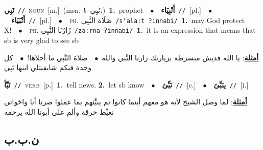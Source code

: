 \documentclass[10pt,a4paper,twoside]{article} %
\begin{document}
\begin{multicols}{2}
{\setlength\topsep{0pt}\textbf{\foreignlanguage{arabic}{نَبِي}}\ {\color{gray}\texttt{//}\color{black}}\ \textsc{noun}\ [m.]\ \color{gray}(msa. \foreignlanguage{arabic}{نَبِي}~\foreignlanguage{arabic}{\textbf{١.}})\color{black}\ \textbf{1.}~prophet\ \ $\bullet$\ \ \setlength\topsep{0pt}\textbf{\foreignlanguage{arabic}{أَنْبِيَاء}}\ {\color{gray}\texttt{//}\color{black}}\ [pl.]\ \ $\bullet$\ \ \setlength\topsep{0pt}\textbf{\foreignlanguage{arabic}{أَنْبَيَاء}}\ {\color{gray}\texttt{//}\color{black}}\ [pl.]\ \ $\bullet$\ \ \textsc{ph.} \color{gray} \foreignlanguage{arabic}{صَلَاة النَّبِي}\color{black}\ {\color{gray}\texttt{/{\sffamily sˤalaːt ʔinnabi}/}\color{black}}\ \textbf{1.}~may God protect X!\ \ $\bullet$\ \ \textsc{ph.} \color{gray} \foreignlanguage{arabic}{زَارْنَا النَّبِي}\color{black}\ {\color{gray}\texttt{/{\sffamily zaːrna ʔinnabi}/}\color{black}}\ \textbf{1.}~it is an expression that means that sb is very glad to see sb\  \begin{flushright}\color{gray}\foreignlanguage{arabic}{\textbf{\underline{\foreignlanguage{arabic}{أمثلة}}}: يا الله قديش مبسزطة بزيارتك زارنا النَّبي والله\ $\bullet$\ \  صلاة النَّبي ما أحلاها!\ $\bullet$\ \  كل وحدة فيكم شايفيتلي ابنها نَبِي}\end{flushright}\color{black}} \vspace{2mm}

{\setlength\topsep{0pt}\textbf{\foreignlanguage{arabic}{نَبَّأ}}\ {\color{gray}\texttt{//}\color{black}}\ \textsc{verb}\ [p.]\ \textbf{1.}~tell news.  \textbf{2.}~let sb know\ \ $\bullet$\ \ \setlength\topsep{0pt}\textbf{\foreignlanguage{arabic}{نَبِّئ}}\ {\color{gray}\texttt{//}\color{black}}\ [c.]\ \ $\bullet$\ \ \setlength\topsep{0pt}\textbf{\foreignlanguage{arabic}{ينَبِّئ}}\ {\color{gray}\texttt{//}\color{black}}\ [i.]\  \begin{flushright}\color{gray}\foreignlanguage{arabic}{\textbf{\underline{\foreignlanguage{arabic}{أمثلة}}}: لما وصل الشيخ لآية هو معهم أينما كانوا ثم ينبِّئهم بما عملوا صرنا أنا واخواتي نعيِّط حرقة وألم على أبونا الله يرحمه}\end{flushright}\color{black}} \vspace{2mm}

\vspace{-3mm}
\subsection*{\color{blue}\foreignlanguage{arabic}{ن.ب.ب}\color{blue}{}} 


\end{multicols}
\end{document}
